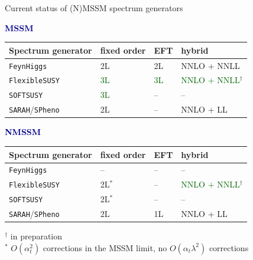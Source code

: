 \documentclass[hyperref={pdfpagelabels=false},ngerman]{beamer}
\renewcommand{\emph}[1]{\textbf{\textcolor{darkblue}{#1}}}
\newcommand{\FS}{\texttt{FlexibleSUSY}\xspace}
\newcommand{\FH}{\texttt{FeynHiggs}\xspace}
\newcommand{\SPheno}{\texttt{SPheno}\xspace}
\newcommand{\SARAH}{\texttt{SARAH}\xspace}
\newcommand{\SOFTSUSY}{\texttt{SOFTSUSY}\xspace}
\newcommand{\at}{\alpha_t}
\begin{document}

\begin{frame}[noframenumbering]{Current status of (N)MSSM spectrum generators}
  \begin{center}
    \emph{MSSM}\\[0.4em]
    \begin{tabular}{llll}
      \toprule
      Spectrum generator & fixed order & EFT & hybrid \\
      \midrule
      \FH                & 2L & 2L & NNLO + NNLL \\
      \FS                & \textcolor{darkgreen}{3L} & \textcolor{darkgreen}{3L} & \textcolor{darkgreen}{NNLO + NNLL}$^\dagger$ \\
      \SOFTSUSY          & \textcolor{darkgreen}{3L} & -- & -- \\
      \SARAH/\SPheno     & 2L & -- & NNLO + LL \\
      \bottomrule
    \end{tabular}
  \end{center}
  \begin{center}
    \emph{NMSSM}\\[0.4em]
    \begin{tabular}{llll}
      \toprule
      Spectrum generator & fixed order & EFT & hybrid \\
      \midrule
      \FH                & -- & -- & -- \\
      \FS                & 2L$^*$ & -- & \textcolor{darkgreen}{NNLO + NNLL}$^\dagger$ \\
      \SOFTSUSY          & 2L$^*$ & -- & -- \\
      \SARAH/\SPheno     & 2L & 1L & NNLO + LL \\
      \bottomrule
    \end{tabular}
  \end{center}
  $^\dagger$ in preparation\\
  $^*$ $O(\at^2)$ corrections in the MSSM limit, no $O(\at\lambda^2)$ corrections
\end{frame}

\end{document}
